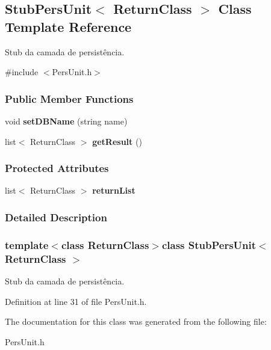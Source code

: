 \hypertarget{classStubPersUnit}{\subsection{Stub\-Pers\-Unit$<$ Return\-Class $>$ Class Template Reference}
\label{d5/dfd/classStubPersUnit}
}


Stub da camada de persistência.  




{\ttfamily \#include $<$Pers\-Unit.\-h$>$}

\subsubsection*{Public Member Functions}
\begin{DoxyCompactItemize}
\item 
\hypertarget{classStubPersUnit_a85372c81d59b3c7c765d013c8d34fec5}{void {\bfseries set\-D\-B\-Name} (string name)}\label{d5/dfd/classStubPersUnit_a85372c81d59b3c7c765d013c8d34fec5}

\item 
\hypertarget{classStubPersUnit_a6911707b204e735e1eab885e544dbd6c}{list$<$ Return\-Class $>$ {\bfseries get\-Result} ()}\label{d5/dfd/classStubPersUnit_a6911707b204e735e1eab885e544dbd6c}

\end{DoxyCompactItemize}
\subsubsection*{Protected Attributes}
\begin{DoxyCompactItemize}
\item 
\hypertarget{classStubPersUnit_af932467573f602fe0853e30be7d56f10}{list$<$ Return\-Class $>$ {\bfseries return\-List}}\label{d5/dfd/classStubPersUnit_af932467573f602fe0853e30be7d56f10}

\end{DoxyCompactItemize}


\subsubsection{Detailed Description}
\subsubsection*{template$<$class Return\-Class$>$class Stub\-Pers\-Unit$<$ Return\-Class $>$}

Stub da camada de persistência. 

Definition at line 31 of file Pers\-Unit.\-h.



The documentation for this class was generated from the following file\-:\begin{DoxyCompactItemize}
\item 
Pers\-Unit.\-h\end{DoxyCompactItemize}
